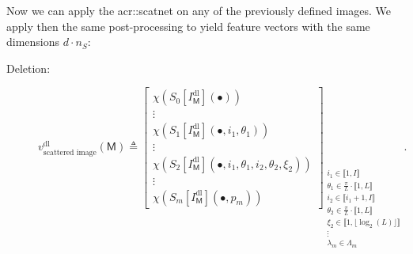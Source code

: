             Now we can apply the \gls{acr::scatnet} on any of the previously defined images.
            We apply then the same post-processing to yield feature vectors with the same dimensions \(d \cdot n_S\):

            \begin{description}
                \item[Deletion:]
                        \begin{equation}
                            \label{eq::deletion_scanetg_image_based_features}
                            v^{\text{dl}}_{\text{scattered image}}\left(\mathsf{M}\right) \triangleq \begin{bmatrix}
                                \chi \left(S_0[I^{\text{dl}}_{\mathsf{M}}]\left(\bullet\right)\right)\\
                                \vdots\\
                                \chi \left(S_1[I^{\text{dl}}_{\mathsf{M}}]\left(\bullet, i_1, \theta_1\right)\right)\\
                                \vdots\\
                                \chi \left(S_2[I^{\text{dl}}_{\mathsf{M}}]\left(\bullet, i_1, \theta_1, i_2, \theta_2, \xi_2\right)\right)\\
                                \vdots\\
                                \chi \left(S_m[I^{\text{dl}}_{\mathsf{M}}]\left(\bullet, p_m\right)\right)
                            \end{bmatrix}_{
                                \substack{
                                    i_1 \in \llbracket 1, I \rrbracket\\
                                    \theta_1 \in \frac{\pi}{L} \cdot \llbracket 1, L \rrbracket\\
                                    i_2 \in \llbracket i_1 + 1, I \rrbracket\\
                                    \theta_2 \in \frac{\pi}{L} \cdot \llbracket 1, L \rrbracket\\
                                    \xi_2 \in \llbracket 1, \lfloor\log_2(L)\rfloor \rrbracket\\
                                    \vdots\\
                                    \lambda_m \in \Lambda_m
                                }
                            }.
                        \end{equation}

\end{description}

